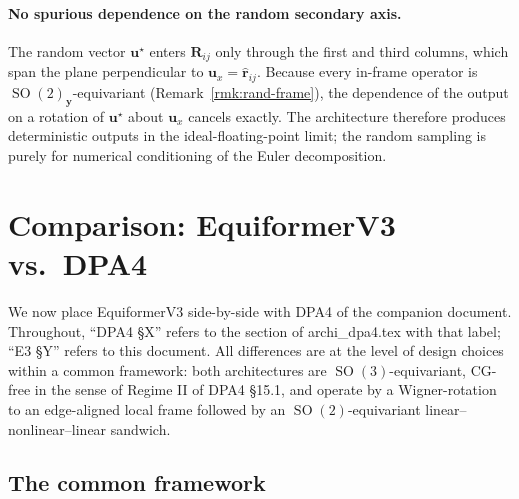 \documentclass[11pt,a4paper]{article}
\DeclareMathOperator{\SO}{SO}
\newcommand{\bR}{\bm{R}}
\newcommand{\brh}{\hat{\bm{r}}}
\newcommand{\by}{\bm{y}}
\newcommand{\bu}{\bm{u}}
\theoremstyle{plain}
\theoremstyle{definition}
\theoremstyle{remark}
\begin{document}
\paragraph{No spurious dependence on the random secondary axis.}
The random vector $\bu^\star$ enters $\bR_{ij}$ only through the first and
third columns, which span the plane perpendicular to $\bu_x=\brh_{ij}$. Because
every in-frame operator is $\SO(2)_{\by}$-equivariant
(Remark~\ref{rmk:rand-frame}), the dependence of the output on a rotation of
$\bu^\star$ about $\bu_x$ cancels exactly. The architecture therefore produces
deterministic outputs in the ideal-floating-point limit; the random sampling is
purely for numerical conditioning of the Euler decomposition.

\section{Comparison: EquiformerV3 vs.\ DPA4}\label{sec:compare}

We now place EquiformerV3 side-by-side with DPA4 of the companion document.
Throughout, ``DPA4 \S X'' refers to the section of archi\_dpa4.tex with that
label; ``E3 \S Y'' refers to this document. All differences are at the level of
design choices within a common framework: both architectures are
$\SO(3)$-equivariant, CG-free in the sense of Regime II of DPA4 \S15.1, and
operate by a Wigner-rotation to an edge-aligned local frame followed by an
$\SO(2)$-equivariant linear--nonlinear--linear sandwich.

\subsection{The common framework}\label{sec:compare-common}
\end{document}
